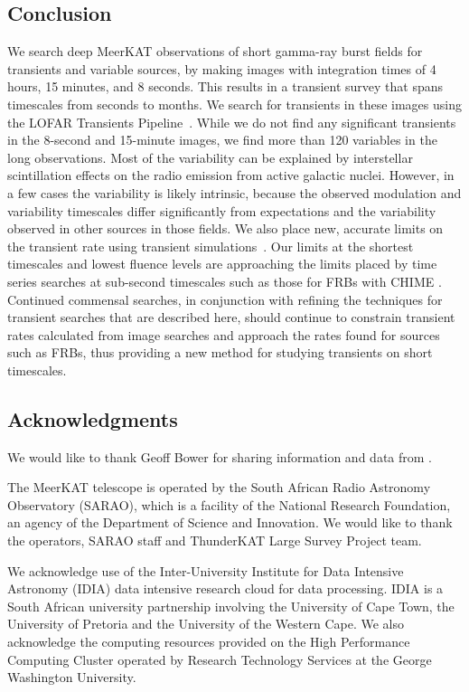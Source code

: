 \documentclass[12pt]{article}
\begin{document}
\subsection{Conclusion}
We search deep MeerKAT observations of short gamma-ray burst fields for transients and variable sources, by making images with integration times of 4 hours, 15 minutes, and 8 seconds. This results in a transient survey that spans timescales from seconds to months. We search for transients in these images using the LOFAR Transients Pipeline~\citep{2015A&C....11...25S}. While we do not find any significant transients in the 8-second and 15-minute images, we find more than 120 variables in the long observations. Most of the variability can be explained by interstellar scintillation effects on the radio emission from active galactic nuclei. However, in a few cases the variability is likely intrinsic, because the observed modulation and variability timescales differ significantly from expectations and the variability observed in other sources in those fields. We also place new, accurate limits on the transient rate using transient simulations~\citep{2022ascl.soft04007C}. Our limits at the shortest timescales and lowest fluence levels are approaching the limits placed by time series searches at sub-second timescales such as those for FRBs with CHIME \citep{2021ApJS..257...59C}. Continued commensal searches, in conjunction with refining the techniques for transient searches that are described here, should continue to constrain transient rates calculated from image searches and approach the rates found for sources such as FRBs, thus providing a new method for studying transients on short timescales.

\subsection{Acknowledgments}
We would like to thank Geoff Bower for sharing information and data from \citet{2011ApJ...728L..14B}. 

The MeerKAT telescope is operated by the South African Radio Astronomy Observatory (SARAO), which is a facility of the National Research Foundation, an agency of the Department of Science and Innovation. We would like to thank the operators, SARAO staff and ThunderKAT Large Survey Project team.

We acknowledge use of the Inter-University Institute for Data Intensive Astronomy (IDIA) data intensive research cloud for data processing. IDIA is a South African university partnership involving the University of Cape Town, the University of Pretoria and the University of the Western Cape. We also acknowledge the computing resources provided on the High Performance Computing Cluster operated by Research Technology Services at the George Washington University.
\end{document}
